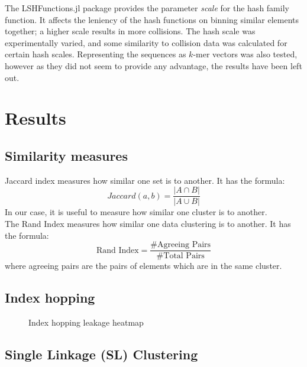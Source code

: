 \documentclass[times, twoside, watermark]{zHenriquesLab-StyleBioRxiv}
\begin{document}
The LSHFunctions.jl package provides the parameter \emph{scale} for the hash family function. It affects the leniency of the hash functions on binning similar elements together; a higher scale results in more collisions. The hash scale was experimentally varied, and some similarity to collision data was calculated for certain hash scales. Representing the sequences as $k$-mer vectors was also tested, however as they did not seem to provide any advantage, the results have been left out. 







\section*{Results}


\subsection*{Similarity measures}

Jaccard index measures how similar one set is to another. It has the formula: 
$$ Jaccard(a, b) = \frac{|A \cap B|}{| A \cup B|} $$
In our case, it is useful to measure how similar one cluster is to another. \\

The Rand Index measures how similar one data clustering is to another. It has the formula:
$$\text{Rand Index} = \frac{\text{\# Agreeing Pairs}}{\text{\# Total Pairs}}$$ where agreeing pairs are the pairs of elements which are in the same cluster. 

\subsection*{Index hopping}

\begin{figure}[!h]
    
    \caption{Index hopping leakage heatmap}
    \label{leakageHeatmap}
\end{figure}

\subsection*{Single Linkage (SL) Clustering}
\end{document}
